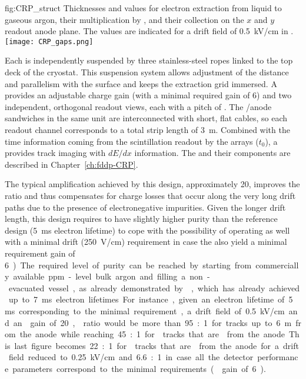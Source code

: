 \begin{dunefigure}{fig:CRP_struct}
{Thicknesses and  values for electron extraction from liquid to gaseous argon, their  multiplication by , and their collection on the $x$ and $y$ readout anode plane. The  values are indicated for a drift field of \SI{0.5}{kV/cm} in .}
\texttt{[image: CRP\_gaps.png]}
\end{dunefigure}

Each  is independently suspended by three stainless-steel ropes linked to the top deck of the cryostat. This suspension system allows adjustment of the  distance and parallelism with the  surface and keeps the extraction grid immersed. A  provides an adjustable charge gain (with a minimal required gain of \num{6}) and two independent, orthogonal readout views, each with a pitch of \dpstrippitch.  The /anode sandwiches  in the same  unit are interconnected with short, flat cables, so each readout channel corresponds to a total strip length of \SI{3}{m}. Combined with the time information coming from the  scintillation readout by the  arrays ($t_0$), a  provides \threed track imaging with $dE/dx$ information.  The  and their components are described in Chapter~\ref{ch:fddp-CRP}.

The typical amplification achieved by this design, approximately 20, improves the  ratio and thus compensates for charge losses that occur along the very long drift paths due to the presence of  electronegative impurities. Given the longer drift length, this design requires  to have slightly higher purity than the reference design  (\SI{5}{ms} electron lifetime) to cope with the possibility of operating as well with a minimal drift \efield (\SI{250}{V/cm}) requirement in case the  also yield a minimal requirement gain of \SI{6}). The required level of purity can be reached by starting from  commercially available ppm-level bulk argon and filling a non-evacuated vessel, as already demonstrated by , which has already achieved up to \SI{7}{ms} electron lifetimes.

For instance, given an electron lifetime of \SI{5}{ms} corresponding to the minimal requirement,  a drift field of \SI{0.5}{kV/cm} and an  gain of \num{20},  ratio would be more than  \num{95}:\num{1} for tracks up to \SI{6}{m} from the anode while reaching  \num{45}:\num{1} for   tracks that are \dpmaxdrift from the anode. This last figure becomes  \num{22}:\num{1} for   tracks that are \dpmaxdrift from the anode for a drift field reduced to  \SI{0.25}{kV/cm} and \num{6.6}:\num{1} in case all the detector performance parameters correspond to the minimal requirements ( gain of  \SI{6}).

